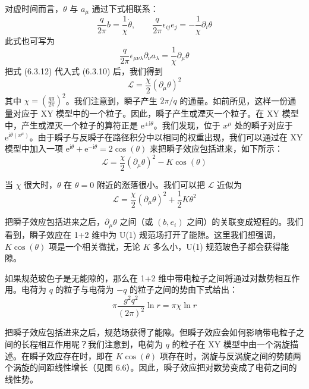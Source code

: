 对虚时间而言，$\theta$ 与 $a_{\mu}$ 通过下式相联系：
\begin{equation*}
\frac{q}{2\pi}b=\frac{1}{\chi}\dot{\theta}, \qquad \frac{q}{2\pi}\epsilon_{ij}e_{j}=-\frac{1}{\chi}\partial_{i}\theta \tag{6.3.11}
\end{equation*}
此式也可写为
\begin{equation*}
\frac{q}{2\pi}\epsilon_{\mu\nu\lambda}\partial_{\nu}a_{\lambda}=\frac{1}{\chi}\partial_{\mu}\theta \tag{6.3.12}
\end{equation*}
把式 (6.3.12) 代入式 (6.3.10) 后，我们得到
\begin{equation*}
\mathcal{L}=\frac{\chi}{2}(\partial_{\mu}\theta)^{2}
\end{equation*}
其中 $\chi=\left(\frac{qg}{2\pi}\right)^{2}$。我们注意到，瞬子产生 $2\pi/q$ 的通量。如前所见，这样一份通量对应于 XY 模型中的一个粒子。因此，瞬子产生或湮灭一个粒子。在 XY 模型中，产生或湮灭一个粒子的算符正是 $\mathrm{e}^{\pm\mathrm{i}\theta}$。我们发现，位于 $x^{\mu}$ 处的瞬子对应于 $\mathrm{e}^{\mathrm{i}\theta(x^{\mu})}$。由于瞬子与反瞬子在路径积分中以相同的权重出现，我们可以通过在 XY 模型中加入一项 $\mathrm{e}^{\mathrm{i}\theta}+\mathrm{e}^{-\mathrm{i}\theta}=2\cos(\theta)$ 来把瞬子效应包括进来，如下所示：
\begin{equation*}
\mathcal{L}=\frac{\chi}{2}(\partial_{\mu}\theta)^{2}-K\cos(\theta)
\end{equation*}

当 $\chi$ 很大时，$\theta$ 在 $\theta=0$ 附近的涨落很小。我们可以把 $\mathcal{L}$ 近似为
\begin{equation*}
\mathcal{L}=\frac{\chi}{2}(\partial_{\mu}\theta)^{2}+\frac{1}{2}K\theta^{2}
\end{equation*}

把瞬子效应包括进来之后，$\partial_{\mu}\theta$ 之间（或 $(b,e_{i})$ 之间）的关联变成短程的。我们看到，瞬子效应在 1+2 维中为 U(1) 规范场打开了能隙。这里我们想强调，$K\cos(\theta)$ 项是一个相关微扰，无论 $K$ 多么小，U(1) 规范玻色子都会获得能隙。

如果规范玻色子是无能隙的，那么在 1+2 维中带电粒子之间将通过对数势相互作用。电荷为 $q$ 的粒子与电荷为 $-q$ 的粒子之间的势由下式给出：
\begin{equation*}
\pi\frac{g^{2}q^{2}}{(2\pi)^{2}}\ln r=\pi\chi\ln r
\end{equation*}

把瞬子效应包括进来之后，规范场获得了能隙。但瞬子效应会如何影响带电粒子之间的长程相互作用呢？我们注意到，电荷为 $q$ 的粒子在 XY 模型中由一个涡旋描述。在瞬子效应存在时，即在 $K\cos(\theta)$ 项存在时，涡旋与反涡旋之间的势随两个涡旋的间距线性增长（见图 6.6）。因此，瞬子效应把对数势变成了电荷之间的线性势。

